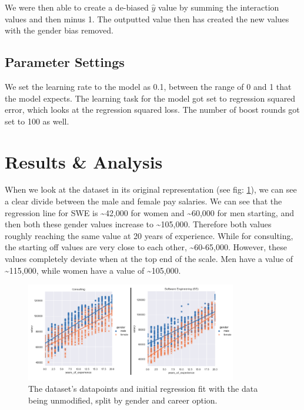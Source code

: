 \documentclass{sigchi}
\begin{document}
	We were then able to create a de-biased $\hat{y}$ value by summing the interaction values and then minus 1. The outputted value then has created the new values with the gender bias removed.




\subsection{Parameter Settings}
	We set the learning rate to the model as 0.1, between the range of 0 and 1 that the model expects. The learning task for the model got set to regression squared error, which looks at the regression squared loss. The number of boost rounds got set to 100 as well.

\section{Results \& Analysis}
	
	When we look at the dataset in its original representation (see fig: \ref{fig:original_data}), we can see a clear divide between the male and female pay salaries. We can see that the regression line for SWE is \textasciitilde{42,000} for women and \textasciitilde{60,000} for men starting, and then both these gender values increase to \textasciitilde{105,000}. Therefore both values roughly reaching the same value at 20 years of experience. While for consulting, the starting off values are very close to each other, \textasciitilde{60-65,000}. However, these values completely deviate when at the top end of the scale. Men have a value of \textasciitilde{115,000}, while women have a value of \textasciitilde{105,000}.

	\begin{figure}[h]
		\includegraphics[width=9.2cm]{original_data.png}
		\caption{The dataset's datapoints and initial regression fit with the data being unmodified, split by gender and career option.}
		\label{fig:original_data}
		\centering
	\end{figure}
\end{document}
